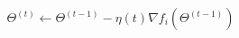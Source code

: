 \documentclass[preview]{standalone}
\begin{document}
\begin{align*}
\quad \Theta^{(t)} \gets \Theta^{(t-1)} - \eta(t) \nabla f_i(\Theta^{(t-1)})
\end{align*}
\end{document}
